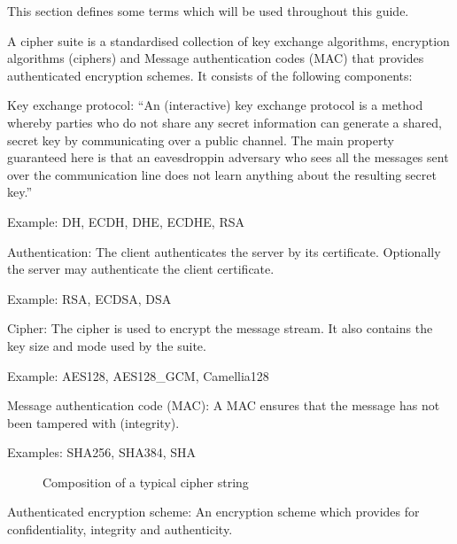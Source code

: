 
This section defines some terms which will be used throughout this guide.


A cipher suite is a standardised collection of key exchange algorithms, encryption 
algorithms (ciphers) and Message authentication codes (MAC) that provides authenticated 
encryption schemes. It consists of the following components:

\begin{description}
\item{Key exchange protocol:}
``An (interactive) key exchange protocol is a method whereby parties who do not 
share any secret information can generate a shared, secret key by communicating 
over a public channel. The main property guaranteed here is that an 
eavesdroppin adversary who sees all the messages sent over the communication 
line does not learn anything about the resulting secret key.'' \cite{katz2008introduction}

Example: DH, ECDH, DHE, ECDHE, RSA

\item{Authentication:}
The client authenticates the server by its certificate. Optionally the server 
may authenticate the client certificate.

Example: RSA, ECDSA, DSA

\item{Cipher:}
The cipher is used to encrypt the message stream. It also contains the key size
and mode used by the suite.

Example: AES128, AES128\_GCM, Camellia128

\item{Message authentication code (MAC):}
A MAC ensures that the message has not been tampered with (integrity).

Examples: SHA256, SHA384, SHA


\begin{figure}[h]
\caption{Composition of a typical cipher string}
\end{figure}


\item{Authenticated encryption scheme:}
An encryption scheme which provides for confidentiality, integrity and authenticity.

\end{description}
